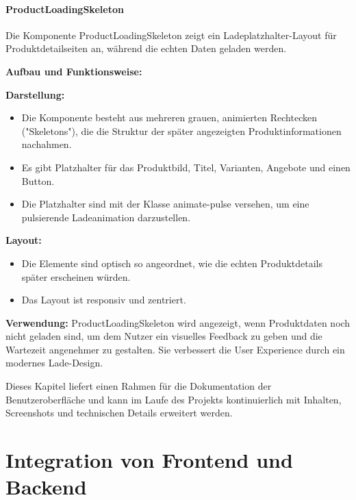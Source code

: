 \documentclass[12pt, a4paper]{report} %
\newcommand{\authorinitials}{} %
\begin{document}
\subsubsection{ProductLoadingSkeleton}
Die Komponente ProductLoadingSkeleton zeigt ein Ladeplatzhalter-Layout für Produktdetailseiten an, während die echten Daten geladen werden.

\noindent\textbf{Aufbau und Funktionsweise:}

\textbf{Darstellung:}
\begin{itemize}
    \item Die Komponente besteht aus mehreren grauen, animierten Rechtecken ("Skeletons"), die die Struktur der später angezeigten Produktinformationen nachahmen.
    \item Es gibt Platzhalter für das Produktbild, Titel, Varianten, Angebote und einen Button.
    \item Die Platzhalter sind mit der Klasse animate-pulse versehen, um eine pulsierende Ladeanimation darzustellen.
\end{itemize}

\textbf{Layout:}
\begin{itemize}
    \item Die Elemente sind optisch so angeordnet, wie die echten Produktdetails später erscheinen würden.
    \item Das Layout ist responsiv und zentriert.
\end{itemize}

\noindent\textbf{Verwendung:} ProductLoadingSkeleton wird angezeigt, wenn Produktdaten noch nicht geladen sind, um dem Nutzer ein visuelles Feedback zu geben und die Wartezeit angenehmer zu gestalten. Sie verbessert die User Experience durch ein modernes Lade-Design.

\vspace{1em}
\noindent
Dieses Kapitel liefert einen Rahmen für die Dokumentation der Benutzeroberfläche und kann im Laufe des Projekts kontinuierlich mit Inhalten, Screenshots und technischen Details erweitert werden.

\chapter{Integration von Frontend und Backend}
\renewcommand{\authorinitials}{DH}

\label{chap:integration}
\end{document}
